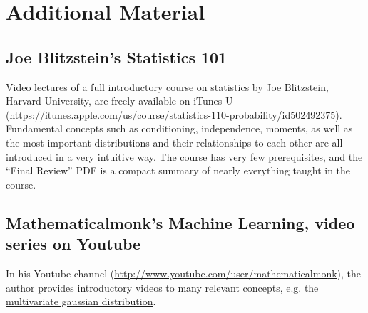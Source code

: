 \documentclass[twoside]{article}
\begin{document}
\section*{Additional Material}
\subsection*{Joe Blitzstein's Statistics 101}
Video lectures of a full introductory course on statistics by Joe Blitzstein, Harvard University, are freely available on iTunes U (\url{https://itunes.apple.com/us/course/statistics-110-probability/id502492375}). Fundamental concepts such as conditioning, independence, moments, as well as the most important distributions and their relationships to each other are all introduced in a very intuitive way. The course has very few prerequisites, and the ``Final Review'' PDF is a compact summary of nearly everything taught in the course.

\subsection*{Mathematicalmonk's Machine Learning, video series on Youtube}
In his Youtube channel (\url{http://www.youtube.com/user/mathematicalmonk}), the author provides introductory videos to many relevant concepts, e.g. the \href{http://www.youtube.com/watch?v=TC0ZAX3DA88}{multivariate gaussian distribution}.

%
%
\end{document}
